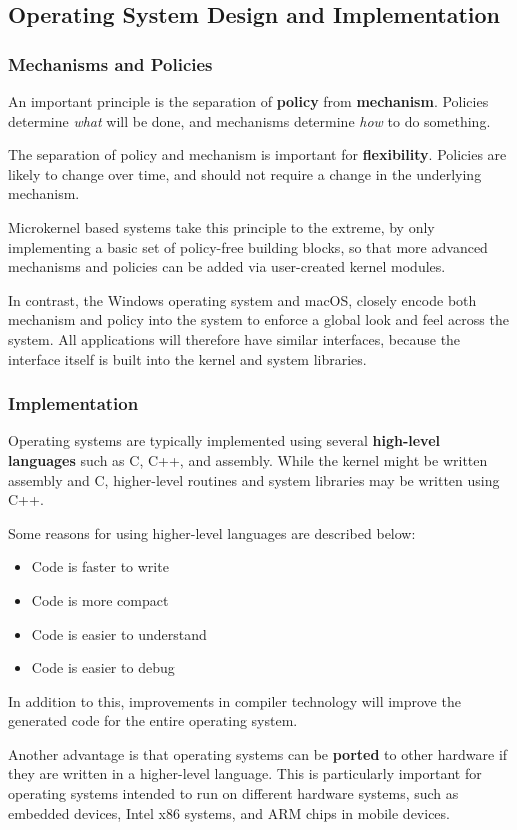 \documentclass{article}
\begin{document}
\subsection{Operating System Design and Implementation}
\subsubsection{Mechanisms and Policies}
An important principle is the separation of \textbf{policy} from \textbf{mechanism}.
Policies determine \textit{what} will be done, and mechanisms determine \textit{how}
to do something.

The separation of policy and mechanism is important for \textbf{flexibility}. Policies
are likely to change over time, and should not require a change in the underlying mechanism.

Microkernel based systems take this principle to the extreme, by only implementing a
basic set of policy-free building blocks, so that more advanced mechanisms and policies
can be added via user-created kernel modules.

In contrast, the Windows operating system and macOS, closely encode both mechanism and policy
into the system to enforce a global look and feel across the system. All applications
will therefore have similar interfaces, because the interface itself is built into the kernel and
system libraries.
\subsubsection{Implementation}
Operating systems are typically implemented using several \textbf{high-level languages} such as
C, C++, and assembly.
While the kernel might be written assembly and C, higher-level routines and system libraries
may be written using C++.

Some reasons for using higher-level languages are described below:
\begin{itemize}
    \item Code is faster to write
    \item Code is more compact
    \item Code is easier to understand
    \item Code is easier to debug
\end{itemize}
In addition to this, improvements in compiler technology will improve the generated code for the
entire operating system.

Another advantage is that operating systems can be \textbf{ported} to other
hardware if they are written in a higher-level language. This is particularly important
for operating systems intended to run on different hardware systems, such as embedded devices,
Intel x86 systems, and ARM chips in mobile devices.
\end{document}
